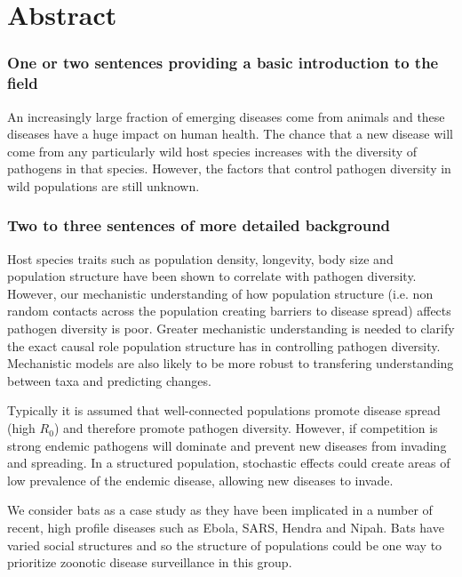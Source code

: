 
\clearpage
\section{Abstract}

\subsubsection{One or two sentences providing a basic introduction to the field}
An increasingly large fraction of emerging diseases come from animals and these diseases have a huge impact on human health.
The chance that a new disease will come from any particularly wild host species increases with the diversity of pathogens in that species.
However, the factors that control pathogen diversity in wild populations are still unknown.



\subsubsection{Two to three sentences of more detailed background}

Host species traits such as population density, longevity, body size and population structure have been shown to correlate with pathogen diversity.
However, our mechanistic understanding of how population structure (i.e. non random contacts across the population creating barriers to disease spread) affects pathogen diversity is poor.
Greater mechanistic understanding is needed to clarify the exact causal role population structure has in controlling pathogen diversity.
Mechanistic models are also likely to be more robust to transfering understanding between taxa and predicting changes. %

Typically it is assumed that well-connected populations promote disease spread (high $R_0$) and therefore promote pathogen diversity.
However, if competition is strong endemic pathogens will dominate and prevent new diseases from invading and spreading.
In a structured population, stochastic effects could create areas of low prevalence of the endemic disease, allowing new diseases to invade.

We consider bats as a case study as they have been implicated in a number of recent, high profile diseases such as Ebola, SARS, Hendra and Nipah.
Bats have varied social structures and so the structure of populations could be one way to prioritize zoonotic disease surveillance in this group.

